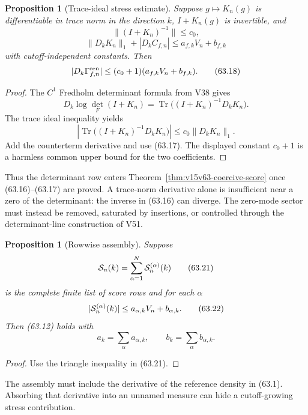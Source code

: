 \documentclass[11pt]{article}
\newtheorem{proposition}[theorem]{Proposition}
\theoremstyle{remark}
\begin{document}
\begin{proposition}[Trace-ideal stress estimate]
\label{prop:v15v63-det-stress}
Suppose \(g\mapsto K_n(g)\) is differentiable in trace norm in the
direction \(k\), \(I+K_n(g)\) is invertible, and
\[
 \|(I+K_n)^{-1}\|\leq c_0,                             \tag{63.16}
\]
\[
 \|D_kK_n\|_1+|D_kC_{f,n}|
 \leq a_{f,k}V_n+b_{f,k}                              \tag{63.17}
\]
with cutoff-independent constants.  Then
\[
 |D_k\Gamma^{\rm ren}_{f,n}|
 \leq
 (c_0+1)(a_{f,k}V_n+b_{f,k}).                         \tag{63.18}
\]
\end{proposition}

\begin{proof}
The \(C^1\) Fredholm determinant formula from V38 gives
\[
 D_k\log\det_{\!F}(I+K_n)
 =
 \operatorname{Tr}\bigl((I+K_n)^{-1}D_kK_n\bigr).      \tag{63.19}
\]
The trace ideal inequality yields
\[
 \left|
 \operatorname{Tr}\bigl((I+K_n)^{-1}D_kK_n\bigr)
 \right|
 \leq c_0\|D_kK_n\|_1.                                \tag{63.20}
\]
Add the counterterm derivative and use (63.17).  The displayed
constant \(c_0+1\) is a harmless common upper bound for the two
coefficients.
\end{proof}

Thus the determinant row enters
Theorem~\ref{thm:v15v63-coercive-score} once (63.16)--(63.17)
are proved.  A trace-norm derivative alone is insufficient near a
zero of the determinant: the inverse in (63.16) can diverge.  The
zero-mode sector must instead be removed, saturated by insertions,
or controlled through the determinant-line construction of V51.

\begin{proposition}[Rowwise assembly]
\label{prop:v15v63-rowwise}
Suppose
\[
 {\cal S}_n(k)=\sum_{\alpha=1}^{N}{\cal S}^{(\alpha)}_n(k)
                                                               \tag{63.21}
\]
is the complete finite list of score rows and for each \(\alpha\)
\[
 |{\cal S}^{(\alpha)}_n(k)|
 \leq a_{\alpha,k}V_n+b_{\alpha,k}.                   \tag{63.22}
\]
Then (63.12) holds with
\[
 a_k=\sum_\alpha a_{\alpha,k},\qquad
 b_k=\sum_\alpha b_{\alpha,k}.                        \tag{63.23}
\]
\end{proposition}

\begin{proof}
Use the triangle inequality in (63.21).
\end{proof}

The assembly must include the derivative of the reference density
in (63.1).  Absorbing that derivative into an unnamed measure can
hide a cutoff-growing stress contribution.
\end{document}
